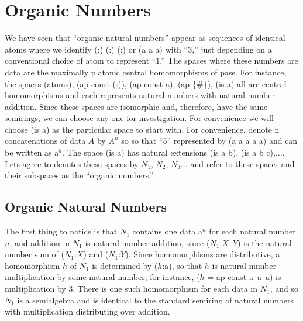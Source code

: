 \documentclass[11pt]{article}
\begin{document}
\section{Organic Numbers}

      We have seen that ``organic natural numbers'' appear as sequences of identical atoms where we identify (:) (:) (:) or (a a a) with ``3,'' just depending 
 on a conventional choice of atom to represent ``1.''  The spaces where these numbers are data are the maximally platonic central homomorphisms of 
 pass.  For instance, the spaces (atoms), (ap const (:)), (ap const a), (ap \{\#\}), (is a) all are central homomorphisms and each represents natural numbers 
 with natural number addition.  Since these spaces are isomorphic and, therefore, have the same semirings, we can choose any one for investigation.  
 For convenience we will choose (is a) as the particular space to start with.  For convenience, denote n concatenations of data $A$ by $A^n$ so so that 
 ``5'' represented by (a a a a a) and can be written as a$^5$.  The space (is a) has natural extensions (is a b), (is a b c),$\dots$.  
 Lets agree to denotes these spaces by $N_1$, $N_2$, $N_3\dots$ and refer to these spaces and their subspaces as the ``organic numbers.'' 
      
\subsection{Organic Natural Numbers}     
     
     The first thing to notice is that $N_1$ contains one data a$^n$ for each natural number $n$, and addition in $N_1$ is natural number addition, 
since ($N_1$:$X$\ $Y$) is the natural number sum of ($N_1$:$X$) and ($N_1$:$Y$).  Since homomorphisms are distributive, a homomorphism $h$ of $N_1$ is determined by ($h$:a), so that $h$ is natural number multiplication by some natural number, 
for instance, ($h$ = ap const a\ a\ a) is multiplication by $3$.  There is one such homomorphism for each data in $N_1$, and so $N_1$ is a semialgebra and 
is identical to the standard semiring of natural numbers with multiplication distributing over addition.
     
\end{document}
